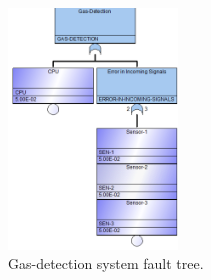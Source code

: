 \begin{figure}[H]
    \centering
    \includegraphics[width=0.4\textwidth]{3_identifying_gaps/benchmarking/datasets/figures/gas_detection_fault_tree.png}
    \caption{Gas-detection system fault tree.}
    \label{fig:gas_detection_fault_tree}
\end{figure}